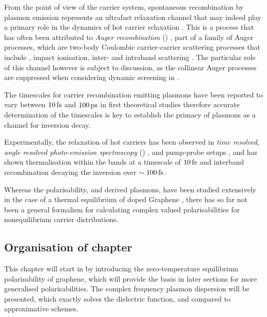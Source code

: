 From the point of view of the carrier system, spontaneous recombination
by plasmon emission represents an ultrafast relaxation channel
\cite{Bostwick2007,George2008,Rana2011} that may indeed play a primary role in
the dynamics of hot carrier relaxation
\cite{Girdhar2011,Malic2011,Kim2011,Winzer2012,Sun2012,Tomadin2013,Sun2013}.
This is a process that has often been attributed to
\emph{Auger recombination} (\ar) \cite{Brida2013, Breusing2011},
part of a family of Auger processes,
which are two-body Coulombic carrier-carrier scattering processes that include
\ar, impact ionisation, inter- and intraband scattering \cite{Tomadin2013}.
The particular role of this channel however is subject to discussion, as the
collinear Auger processes are suppressed when considering dynamic screening in \rpa
\cite{Tomadin2013, Tielrooij2013}.

The timescales for carrier recombination emitting plasmons have been reported to
vary between $10\operatorname{fs}$ and $100\operatorname{ps}$ in first theoretical studies
\cite{Bostwick2007,George2008} therefore accurate determination of the
timescales is key to establish the primacy of plasmons as a channel for
inversion decay.

Experimentally, the relaxation of hot carriers has been observed in
\emph{time resolved, angle resolved photo-emission spectroscopy} (\trarpes)
\cite{Bostwick2007,Gierz2013,Johannsen2013,Gierz2014,Gierz2015},
and pump-probe setups
\cite{Dawlaty2008,Choi2009,Breusing2009,Breusing2011,Sun2012,Li2012,Malard2013,
Jensen2014},
and has shown thermalisation within the bands at a timescale of $10\operatorname{fs}$ and
interband recombination decaying the inversion over $\sim100\operatorname{fs}$. 

Whereas the polarisability, and derived plasmons, have been studied extensively
in the case of a thermal equilibrium of doped Graphene
\cite{Vafek2006,Wunsch2006,Hwang2007,Mikhailov2007,Wang2007,Pyatkovskiy2009,
Ramezanali2009,Jablan2009,Scholz2011,Scholz2012,Gutierrez-Rubio2013},
there has so far not been a general formalism for calculating complex valued
polarisabilities for nonequilibrium carrier distributions.

\subsection{Organisation of chapter}
This chapter will start in  by introducing the zero-temperature
equilibrium polarisability of graphene, which will provide the basis in later
sections for more generalised polarisabilities.
The complex frequency plasmon dispersion will be presented, which exactly solves
the \rpa dielectric function, and compared to approximative schemes.

